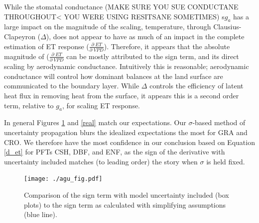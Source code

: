 \documentclass[draft,linenumbers]{agujournal}
\begin{document}
While the stomatal conductance (MAKE SURE YOU SUE CONDUCTANE THROUGHOUT< YOU WERE USING RESITSANE SOMETIMES) s$g_a$ has a large impact on the magnitude of the scaling, temperature, through Clausius-Clapeyron ($\Delta$), does not appear to have as much of an impact in the complete estimation of ET response ($\frac{\partial \; ET}{\partial \; VPD}$). Therefore, it appears that the absolute magnitude of ($\frac{\partial \; ET}{\partial \; VPD}$ can be mostly attributed to the sign term, and its direct scaling by aerodynamic conductance. Intuitively this is reasonable; aerodynamic conductance will control how dominant balances at the land surface are communicated to the boundary layer. While $\Delta$ controls the efficiency of latent heat flux in removing heat from the surface, it appears this is a second order term, relative to $g_a$, for scaling ET response. 

In general Figures  \ref{agu_fig} and \ref{real} match our expectations. Our $\sigma$-based method of uncertainty propagation blurs the idealized expectations the most for GRA and CRO. We therefore have the most confidence in our conclusion based on Equation \ref{d_et} for PFTs CSH, DBF, and ENF, as the sign of the derivative with uncertainty included matches (to leading order) the story when $\sigma$ is held fixed.

\begin{figure}[h]
\centering
\texttt{[image: ./agu\_fig.pdf]}
\caption{Comparison of the sign term with model uncertainty included (box plots) to the sign term as calculated with simplifying assumptions (blue line).}
\label{agu_fig}
\end{figure}
\end{document}
